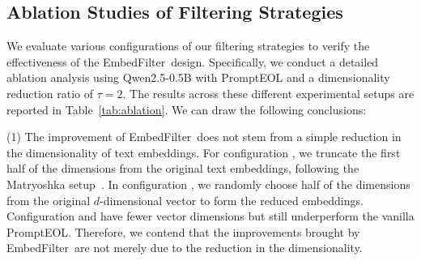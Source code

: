 \documentclass[sigconf]{acmart}
\newcommand{\name}{EmbedFilter}
\newcommand{\circledNum}[1]{%
  \tikz[baseline, anchor=base]{\node[draw,circle,inner sep=0.1pt, font=\fontsize{7.5}{10}\selectfont] {#1};}%
}
\begin{document}
\begin{table}[t]
    \centering
    \caption{MTEB results for \name~and whitening. Best results are highlighted in bold. }
    \vskip -0.05in
    \label{tab:whitening}
\end{table}

\subsection{Ablation Studies of Filtering Strategies}
We evaluate various configurations of our filtering strategies to verify the effectiveness of the \name\ design.
Specifically, we conduct a detailed ablation analysis using Qwen2.5-0.5B with PromptEOL and a dimensionality reduction ratio of \(\tau=2\).
The results across these different experimental setups are reported in Table~\ref{tab:ablation}.
We can draw the following conclusions:

(1) The improvement of \name~does not stem from a simple reduction in the dimensionality of text embeddings.
For configuration \circledNum{1}, we truncate the first half of the dimensions from the original text embeddings, following the Matryoshka setup~\cite{kusupati2022matryoshka}.
In configuration \circledNum{2}, we randomly choose half of the dimensions from the original \(d\)-dimensional vector to form the reduced embeddings.
Configuration \circledNum{1} and \circledNum{2} have fewer vector dimensions but still underperform the vanilla PromptEOL.
Therefore, we contend that the improvements brought by \name\ are not merely due to the reduction in the dimensionality.
\end{document}
